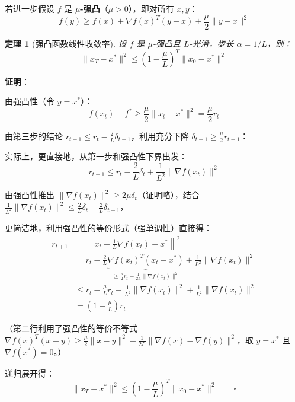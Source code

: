 \documentclass[12pt, a4paper]{ctexart}
\newtheorem{theorem}{定理}[section]
\begin{document}
\begin{blackboard}

若进一步假设 $f$ 是 \textbf{$\mu$-强凸}（$\mu > 0$），即对所有 $x, y$：
\[
    f(y) \geq f(x) + \nabla f(x)^T(y-x) + \frac{\mu}{2}\|y-x\|^2
\]

\begin{theorem}[强凸函数线性收敛率]
设 $f$ 是 $\mu$-强凸且 $L$-光滑，步长 $\alpha = 1/L$，则：
\[
    \|x_T - x^*\|^2 \leq \left(1 - \frac{\mu}{L}\right)^T \|x_0 - x^*\|^2
\]
\end{theorem}

\textbf{证明}：

由强凸性（令 $y = x^*$）：
\[
    f(x_t) - f^* \geq \frac{\mu}{2}\|x_t - x^*\|^2 = \frac{\mu}{2} r_t
\]

由第三步的结论 $r_{t+1} \leq r_t - \frac{2}{L}\delta_{t+1}$，利用充分下降 $\delta_{t+1} \geq \frac{\mu}{2}r_{t+1}$：

实际上，更直接地，从第一步和强凸性下界出发：
\[
    r_{t+1} \leq r_t - \frac{2}{L}\delta_t + \frac{1}{L^2}\|\nabla f(x_t)\|^2
\]

由强凸性推出 $\|\nabla f(x_t)\|^2 \geq 2\mu \delta_t$（证明略），结合 $\frac{1}{L^2}\|\nabla f(x_t)\|^2 \leq \frac{2}{L}\delta_t - \frac{2}{L}\delta_{t+1}$，

更简洁地，利用强凸性的等价形式（强单调性）直接得：
\begin{align*}
    r_{t+1} &= \left\|x_t - \frac{1}{L}\nabla f(x_t) - x^*\right\|^2 \\
    &= r_t - \frac{2}{L}\underbrace{\nabla f(x_t)^T(x_t - x^*)}_{\geq \frac{\mu}{2}r_t + \frac{1}{2L}\|\nabla f(x_t)\|^2}
    + \frac{1}{L^2}\|\nabla f(x_t)\|^2 \\
    &\leq r_t - \frac{\mu}{L} r_t - \frac{1}{L^2}\|\nabla f(x_t)\|^2 + \frac{1}{L^2}\|\nabla f(x_t)\|^2 \\
    &= \left(1 - \frac{\mu}{L}\right) r_t
\end{align*}

（第二行利用了强凸性的等价不等式 $\nabla f(x)^T(x-y) \geq \frac{\mu}{2}\|x-y\|^2 + \frac{1}{2L}\|\nabla f(x) - \nabla f(y)\|^2$，取 $y=x^*$ 且 $\nabla f(x^*)=0$。）

递归展开得：
\[
    \boxed{\|x_T - x^*\|^2 \leq \left(1 - \frac{\mu}{L}\right)^T \|x_0 - x^*\|^2} \qquad \square
\]

\end{blackboard}
\end{document}
